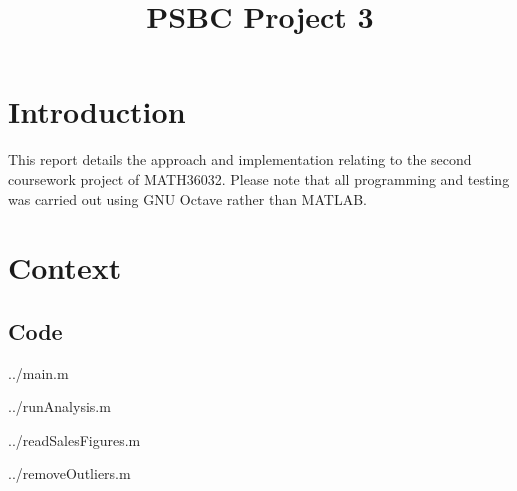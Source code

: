 \documentclass[10pt]{article}
\title{PSBC Project 3}
\newcommand{\inlinemaketitle}{{\let\newpage\relax\maketitle}}
\begin{document}
\inlinemaketitle
\section{Introduction}



This report details the approach and implementation relating to the second coursework project of MATH36032. Please note that all programming and testing was carried out using GNU Octave rather than MATLAB.

\section{Context}




\begin{appendices}

\section{Code}\label{appendix:code}
  {../main.m}

  {../runAnalysis.m}
 
  
    {../readSalesFigures.m}
   
       {../removeOutliers.m}


\end{appendices}



\end{document}
